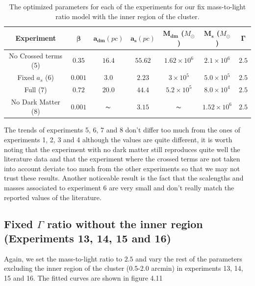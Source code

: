 \begin{table}[]
\centering
\begin{tabular}{| c| c| c| c| c| c| c|}
    \hline
    \textbf{Experiment} & $\mathbf{\beta}$ & $\mathbf{a_{dm}} (pc)$ & $\mathbf{a_{s}} (pc)$ & $\mathbf{M_{dm}}$ ($M_{\odot}$) & $\mathbf{M_{s}}$ ($M_{\odot}$) & $\mathbf{\Gamma}$\\ \hline
	No Crossed terms (5) & $0.35$ &	$16.4$ &	$55.62$ &	$1.62 \times 10^{6}$ &	$2.1 \times 10^{6}$ &	$2.5$\\ \hline
	Fixed $a_s$ (6) &	$0.001$ &	$3.0$ &	$2.23$ &	$3 \times 10^{5}$ &	$5.0 \times 10 ^{5}$ &	$2.5$\\ \hline
	Full (7) &	$0.72$ &	$20.0$ &	$44.4$ &	$5.2 \times 10^{5}$ &	$8.0 \times 10^{4}$ &	$2.5$\\ \hline
	No Dark Matter (8) &	$0.001$ &	$\thicksim$ & $ 3.15$ &	$\thicksim$ & $ 1.52 \times 10^{6}$ & 	$2.5$\\
    \hline
  \end{tabular} 
\caption[Optimized parameters for our fix mass-to-light ratio model with the inner region.]{The optimized parameters for each of the experiments for our fix mass-to-light ratio model with the inner region of the cluster.}
\end{table}

The trends of experiments 5, 6, 7 and 8 don't differ too much from the ones of experiments 1, 2, 3 and 4 although the values are quite different, it is worth noting that the experiment with no dark matter still reproduces quite well the literature data and that the experiment where the crossed terms are not taken into account deviate too much from the other experiments so that we may not trust these results. Another noticeable result is the fact that the scalengths and masses associated to experiment 6 are very small and don't really match the reported values of the literature. 

\subsection{Fixed $\Gamma$ ratio without the inner region (Experiments 13, 14, 15 and 16)}

Again, we set the mass-to-light ratio to $2.5$ and vary the rest of the parameters excluding the inner region of the cluster (0.5-2.0 arcmin) in experiments 13, 14, 15 and 16. The fitted curves are shown in figure 4.11


